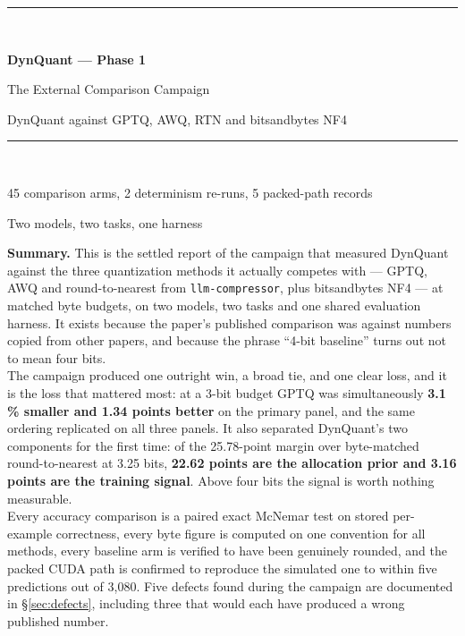 \documentclass[11pt]{article}
\newcommand{\pct}{\,\%}
\newcommand{\code}[1]{\texttt{#1}}
\begin{document}
\begin{titlepage}
\centering
\vspace*{1.0in}
{\color{dqblue}\rule{\textwidth}{1.2pt}}\\[0.8em]
{\Huge\bfseries DynQuant --- Phase 1\par}
\vspace{0.5em}
{\LARGE The External Comparison Campaign\par}
\vspace{0.35em}
{\large DynQuant against GPTQ, AWQ, RTN and bitsandbytes NF4\par}
\vspace{0.7em}
{\color{dqblue}\rule{\textwidth}{1.2pt}}\\[1.8em]
{\large 45 comparison arms, 2 determinism re-runs, 5 packed-path records\par}
\vspace{0.3em}
{\large Two models, two tasks, one harness\par}
\vspace{2.2em}

\begin{minipage}{0.86\textwidth}
\small
\textbf{Summary.} This is the settled report of the campaign that measured DynQuant against
the three quantization methods it actually competes with --- GPTQ, AWQ and round-to-nearest
from \code{llm-compressor}, plus bitsandbytes NF4 --- at matched byte budgets, on two models,
two tasks and one shared evaluation harness. It exists because the paper's published
comparison was against numbers copied from other papers, and because the phrase ``4-bit
baseline'' turns out not to mean four bits.
\\[0.7em]
The campaign produced one outright win, a broad tie, and one clear loss, and it is the loss
that mattered most: at a 3-bit budget GPTQ was simultaneously \textbf{3.1\pct{} smaller and
1.34 points better} on the primary panel, and the same ordering replicated on all three
panels. It also separated DynQuant's two components for the first time: of the 25.78-point
margin over byte-matched round-to-nearest at 3.25 bits, \textbf{22.62 points are the
allocation prior and 3.16 points are the training signal}. Above four bits the signal is
worth nothing measurable.
\\[0.7em]
Every accuracy comparison is a paired exact McNemar test on stored per-example correctness,
every byte figure is computed on one convention for all methods, every baseline arm is
verified to have been genuinely rounded, and the packed CUDA path is confirmed to reproduce
the simulated one to within five predictions out of 3{,}080. Five defects found during the
campaign are documented in \S\ref{sec:defects}, including three that would each have produced
a wrong published number.
\end{minipage}


\end{titlepage}
\end{document}
